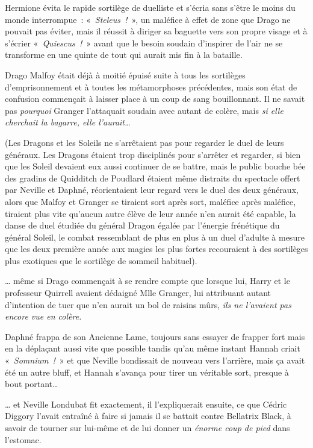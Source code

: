 Hermione évita le rapide sortilège de duelliste et s'écria sans s'être le moins du monde interrompue~: «~\emph{Steleus~!}~», un maléfice à effet de zone que Drago ne pouvait pas éviter, mais il réussit à diriger sa baguette vers son propre visage et à s'écrier «~\emph{Quiescus~!}~» avant que le besoin soudain d'inspirer de l'air ne se transforme en une quinte de tout qui aurait mis fin à la bataille.

Drago Malfoy était déjà à moitié épuisé suite à tous les sortilèges d'emprisonnement et à toutes les métamorphoses précédentes, mais son état de confusion commençait à laisser place à un coup de sang bouillonnant.
Il ne savait pas \emph{pourquoi} Granger l'attaquait soudain avec autant de colère, mais \emph{si elle cherchait la bagarre, elle l'aurait…}

(Les Dragons et les Soleils ne s'arrêtaient pas pour regarder le duel de leurs généraux.
Les Dragons étaient trop disciplinés pour s'arrêter et regarder, si bien que les Soleil devaient eux aussi continuer de se battre, mais le public bouche bée des gradins de Quidditch de Poudlard étaient même distraits du spectacle offert par Neville et Daphné, réorientaient leur regard vers le duel des deux généraux, alors que Malfoy et Granger se tiraient sort après sort, maléfice après maléfice, tiraient plus vite qu'aucun autre élève de leur année n'en aurait été capable, la danse de duel étudiée du général Dragon égalée par l'énergie frénétique du général Soleil, le combat ressemblant de plus en plus à un duel d'adulte à mesure que les deux première année aux magies les plus fortes recouraient à des sortilèges plus exotiques que le sortilège de sommeil habituel).

… même si Drago commençait à se rendre compte que lorsque lui, Harry et le professeur Quirrell avaient dédaigné Mlle Granger, lui attribuant autant d'intention de tuer que n'en aurait un bol de raisins mûrs, \emph{ils ne l'avaient pas encore vue en colère.}

\later

Daphné frappa de son Ancienne Lame, toujours sans essayer de frapper fort mais en la déplaçant aussi vite que possible tandis qu'au même instant Hannah criait «~\emph{Somnium~!}~» et que Neville bondissait de nouveau vers l'arrière, mais ça avait été un autre bluff, et Hannah s'avança pour tirer un véritable sort, presque à bout portant…

… et Neville Londubat fit exactement, il l'expliquerait ensuite, ce que Cédric Diggory l'avait entraîné à faire si jamais il se battait contre Bellatrix Black, à savoir de tourner sur lui-même et de lui donner un \emph{énorme coup de pied} dans l'estomac.


